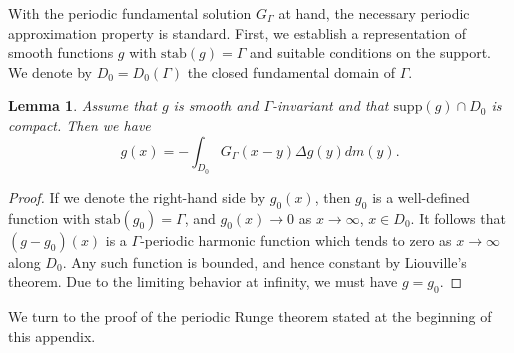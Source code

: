 \documentclass[12pt]{paper}
\numberwithin{equation}{section}
\theoremstyle{plain}
\newtheorem{lemma}[theorem]{Lemma}
\theoremstyle{definition}
\begin{document}
With the periodic fundamental solution \(G_\Gamma\) at hand, the necessary periodic approximation
property is standard. First, we establish a representation of smooth functions \(g\) with
\(\mathrm{stab}(g)=\Gamma\) and suitable conditions on the support.  We denote by
\(D_0=D_0(\Gamma)\) the closed fundamental domain of \(\Gamma\).

\begin{lemma}
  \label{lem:representation}
  Assume that \(g\) is smooth and \(\Gamma\)-invariant and that \(\mathrm{supp}(g)\cap D_0\) is
  compact. Then we have
  \begin{equation}
    \label{eq:green}
    g(x)=-\int_{D_{0}}G_\Gamma(x-y)\Delta g(y) dm(y).
  \end{equation}
\end{lemma}

\begin{proof}
  If we denote the right-hand side by \(g_0(x)\), then \(g_0\) is a well-defined function with
  \(\mathrm{stab}(g_0)=\Gamma\), and \(g_0(x)\to 0\) as \(x\to\infty\), \(x\in D_{0}\).  It follows
  that \((g-g_0)(x)\) is a \(\Gamma\)-periodic harmonic function which tends to zero as
  \(x\to\infty\) along \(D_0\). Any such function is bounded, and hence constant by Liouville's
  theorem. Due to the limiting behavior at infinity, we must have \(g=g_0\).
\end{proof}

We turn to the proof of the periodic Runge theorem stated at the beginning of this appendix.
\end{document}
